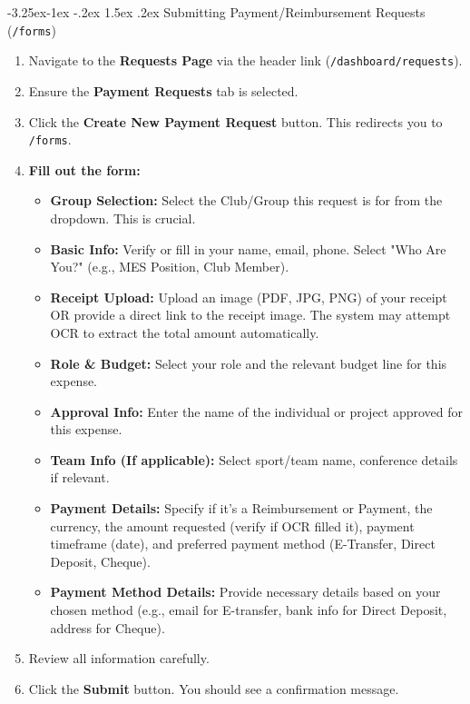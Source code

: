 \documentclass{article}
\makeatletter
\renewcommand \subsection{\@startsection{subsection}{2}{\z@}%
                                     {-3.25ex\@plus -1ex \@minus -.2ex}%
                                     {1.5ex \@plus .2ex}%
                                     {\normalfont\large\bfseries}}
\makeatother
\begin{document}
\subsection{Submitting Payment/Reimbursement Requests (\texttt{/forms})}
\begin{enumerate}
    \item Navigate to the \textbf{Requests Page} via the header link (\texttt{/dashboard/requests}).
    \item Ensure the \textbf{Payment Requests} tab is selected.
    \item Click the \textbf{Create New Payment Request} button. This redirects you to \texttt{/forms}.
    \item \textbf{Fill out the form:}
        \begin{itemize}
            \item \textbf{Group Selection:} Select the Club/Group this request is for from the dropdown. This is crucial.
            \item \textbf{Basic Info:} Verify or fill in your name, email, phone. Select "Who Are You?" (e.g., MES Position, Club Member).
            \item \textbf{Receipt Upload:} Upload an image (PDF, JPG, PNG) of your receipt OR provide a direct link to the receipt image. The system may attempt OCR to extract the total amount automatically.
            \item \textbf{Role \& Budget:} Select your role and the relevant budget line for this expense.
            \item \textbf{Approval Info:} Enter the name of the individual or project approved for this expense.
            \item \textbf{Team Info (If applicable):} Select sport/team name, conference details if relevant.
            \item \textbf{Payment Details:} Specify if it's a Reimbursement or Payment, the currency, the amount requested (verify if OCR filled it), payment timeframe (date), and preferred payment method (E-Transfer, Direct Deposit, Cheque).
            \item \textbf{Payment Method Details:} Provide necessary details based on your chosen method (e.g., email for E-transfer, bank info for Direct Deposit, address for Cheque).
        \end{itemize}
    \item Review all information carefully.
    \item Click the \textbf{Submit} button. You should see a confirmation message.
\end{enumerate}
\end{document}
